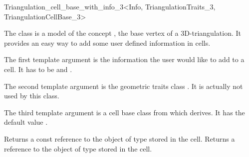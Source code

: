 

\begin{ccRefClass}{Triangulation_cell_base_with_info_3<Info, TriangulationTraits_3, TriangulationCellBase_3>}

\ccDefinition

The class  is a model of the concept
, the base vertex of a 3D-triangulation.
It provides an easy way to add some user defined information in cells.


\ccParameters

The first template argument is the information the user would like to add
to a cell.  It has to be  and .

The second template argument is the geometric traits class
.  It is actually not used by this class.

The third template argument is a cell base class from which
 derives.  It has the default value
.

\ccIsModel {}

\ccInheritsFrom {}

\ccTypes
{}


\ccAccessFunctions
{}
\ccTagFullDeclarations

{Returns a const reference to the object of type  stored in the cell.}
\ccGlue
{}
{Returns a reference to the object of type  stored in the cell.}

\ccSeeAlso

\\

\end{ccRefClass}
